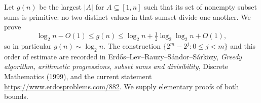 Let $g(n)$ be the largest $|A|$ for $A\subseteq[1,n]$ such that its set of nonempty subset sums is primitive: no two distinct values in that sumset divide one another. We prove
\[
 \log_2 n-O(1)\le g(n)\le\log_2 n+\tfrac12\log_2\log_2 n+O(1),
\]
so in particular $g(n)\sim\log_2 n$. The construction $\{2^m-2^j:0\le j<m\}$ and this order of estimate are recorded in Erd\H{o}s--Lev--Rauzy--S\'andor--S\'ark\"ozy, \emph{Greedy algorithm, arithmetic progressions, subset sums and divisibility}, Discrete Mathematics (1999), and the current statement \url{https://www.erdosproblems.com/882}. We supply elementary proofs of both bounds.
